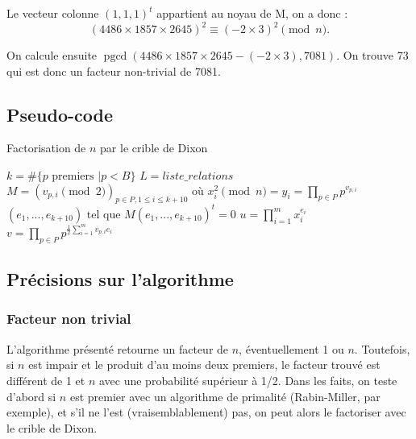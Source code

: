 \documentclass[french, 12pt, titlepage]{article}
\DeclareMathOperator{\pgcd}{pgcd}
\begin{document}
Le vecteur colonne $(1, 1, 1)^t$ appartient au noyau de M, on a donc
: \[(4486 \times 1857 \times 2645)^2 \equiv (-2 \times 3)^2 \pmod
n.\]

On calcule ensuite $\pgcd(4486 \times 1857 \times 2645 - (-2 \times
3), 7081).$ On trouve 73 qui est donc un facteur non-trivial de 7081.

\subsection{Pseudo-code}

\begin{algorithm}
\caption{Factorisation de $n$ par le crible de Dixon}
\BlankLine
$k = \#\{p \text{ premiers } | p < B\}$\;
$L = liste\_relations$\;
$M = (v_{p, i} \pmod 2)_{p \in P, 1 \leq i \leq k + 10} \text{ où }
x_i^2 \pmod n = y_i = \prod\limits_{p \in P}p^{v_{p,i}}$\;
$(e_1, ..., e_{k + 10}) \text{ tel que } M(e_1, ..., e_{k + 10})^t =
0$\;
$u = \prod\limits_{i = 1}^m x_i^{e_i}$\;
$v = \prod\limits_{p \in P} p^{\frac{1}{2} \sum\limits_{i=1}^m v_{p,
    i}e_i}$\;
\Return{$\pgcd(u - v, n)$}
\end{algorithm}

\subsection{Précisions sur l'algorithme}

\subsubsection{Facteur non trivial}

L'algorithme présenté retourne un facteur de $n$, éventuellement 1 ou
$n.$ Toutefois, si $n$ est impair et le produit d'au moins deux
premiers, le facteur trouvé est différent de 1 et $n$ avec une
probabilité supérieur à 1/2. Dans les faits, on teste d'abord si $n$
est premier avec un algorithme de primalité (Rabin-Miller, par
exemple), et s'il ne l'est (vraisemblablement) pas, on peut alors le
factoriser avec le crible de Dixon.
\end{document}
